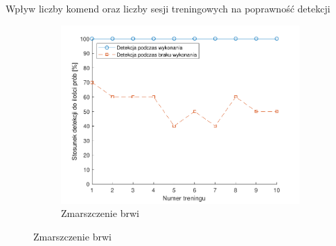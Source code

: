 \documentclass[10pt,aspectratio=169]{beamer}
\begin{document}
\begin{frame}{Wpływ liczby komend oraz liczby sesji treningowych na poprawność detekcji}
\begin{figure}[htb]
    \begin{subfigure}{0.3\linewidth}
    \includegraphics[width=\linewidth,keepaspectratio]{obrazy/frown}
    \caption{Zmarszczenie brwi}
    \end{subfigure}\hspace*{\fill}
  \end{figure}
\end{frame}
\end{document}
